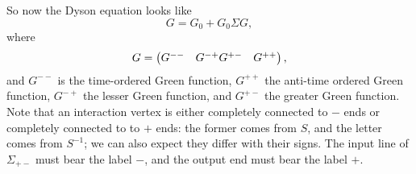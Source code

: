 \documentclass[hyperref, a4paper]{article}
\def\\{}%
\begin{document}
So now the Dyson equation looks like 
\begin{equation}
    G = G_0 + G_0 \Sigma G, 
\end{equation}
where 
\begin{equation}
    G = \pmqty{
        G^{--} & G^{-+} \\ 
        G^{+-} & G^{++}
    }   ,
\end{equation}
and $G^{--}$ is the time-ordered Green function,
$G^{++}$ the anti-time ordered Green function,
$G^{-+}$ the lesser Green function,
and $G^{+-}$ the greater Green function.
Note that an interaction vertex is either completely connected to $-$ ends
or completely connected to to $+$ ends:
the former comes from $S$,
and the letter comes from $S^{-1}$;
we can also expect they differ with their signs.
The input line of $\Sigma_{+-}$ must bear the label $-$,
and the output end must bear the label $+$.
\end{document}
